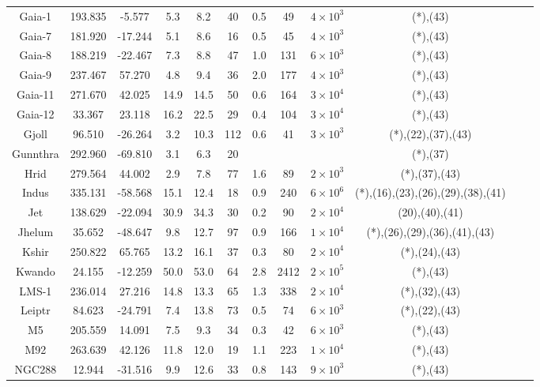 \begin{table}
\begin{tabular}{cSSSScSccccc}
Gaia-1 & 193.835 & -5.577 & 5.3 & 8.2 & 40 & 0.5 & 49 & $4 \times 10^{3}$ & (*),(43) \\
Gaia-7 & 181.920 & -17.244 & 5.1 & 8.6 & 16 & 0.5 & 45 & $4 \times 10^{3}$ & (*),(43) \\
Gaia-8 & 188.219 & -22.467 & 7.3 & 8.8 & 47 & 1.0 & 131 & $6 \times 10^{3}$ & (*),(43) \\
Gaia-9 & 237.467 & 57.270 & 4.8 & 9.4 & 36 & 2.0 & 177 & $4 \times 10^{3}$ & (*),(43) \\
Gaia-11 & 271.670 & 42.025 & 14.9 & 14.5 & 50 & 0.6 & 164 & $3 \times 10^{4}$ & (*),(43) \\
Gaia-12 & 33.367 & 23.118 & 16.2 & 22.5 & 29 & 0.4 & 104 & $3 \times 10^{4}$ & (*),(43) \\
Gjoll & 96.510 & -26.264 & 3.2 & 10.3 & 112 & 0.6 & 41 & $3 \times 10^{3}$ & (*),(22),(37),(43) \\
Gunnthra & 292.960 & -69.810 & 3.1 & 6.3 & 20 & & & & (*),(37) \\
Hrid & 279.564 & 44.002 & 2.9 & 7.8 & 77 & 1.6 & 89 & $2 \times 10^{3}$ & (*),(37),(43) \\
Indus & 335.131 & -58.568 & 15.1 & 12.4 & 18 & 0.9 & 240 & $6 \times 10^{6}$ & (*),(16),(23),(26),(29),(38),(41) \\
Jet & 138.629 & -22.094 & 30.9 & 34.3 & 30 & 0.2 & 90 & $2 \times 10^{4}$ & (20),(40),(41) \\
Jhelum & 35.652 & -48.647 & 9.8 & 12.7 & 97 & 0.9 & 166 & $1 \times 10^{4}$ & (*),(26),(29),(36),(41),(43) \\
Kshir & 250.822 & 65.765 & 13.2 & 16.1 & 37 & 0.3 & 80 & $2 \times 10^{4}$ & (*),(24),(43) \\
Kwando & 24.155 & -12.259 & 50.0 & 53.0 & 64 & 2.8 & 2412 & $2 \times 10^{5}$ & (*),(43) \\
LMS-1 & 236.014 & 27.216 & 14.8 & 13.3 & 65 & 1.3 & 338 & $2 \times 10^{4}$ & (*),(32),(43) \\
Leiptr & 84.623 & -24.791 & 7.4 & 13.8 & 73 & 0.5 & 74 & $6 \times 10^{3}$ & (*),(22),(43) \\
M5 & 205.559 & 14.091 & 7.5 & 9.3 & 34 & 0.3 & 42 & $6 \times 10^{3}$ & (*),(43) \\
M92 & 263.639 & 42.126 & 11.8 & 12.0 & 19 & 1.1 & 223 & $1 \times 10^{4}$ & (*),(43) \\
NGC288 & 12.944 & -31.516 & 9.9 & 12.6 & 33 & 0.8 & 143 & $9 \times 10^{3}$ & (*),(43) \\
\hline \hline
\end{tabular}
\end{table}
